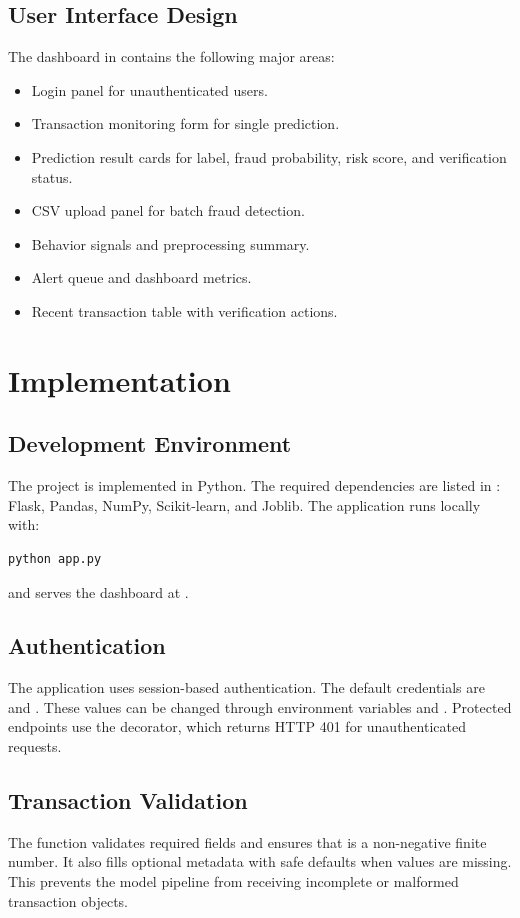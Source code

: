 \documentclass[12pt,a4paper]{report}
\begin{document}
\section{User Interface Design}
The dashboard in  contains the following major areas:
\begin{itemize}
    \item Login panel for unauthenticated users.
    \item Transaction monitoring form for single prediction.
    \item Prediction result cards for label, fraud probability, risk score, and verification status.
    \item CSV upload panel for batch fraud detection.
    \item Behavior signals and preprocessing summary.
    \item Alert queue and dashboard metrics.
    \item Recent transaction table with verification actions.
\end{itemize}

\chapter{Implementation}

\section{Development Environment}
The project is implemented in Python. The required dependencies are listed in : Flask, Pandas, NumPy, Scikit-learn, and Joblib. The application runs locally with:
\begin{verbatim}
python app.py
\end{verbatim}
and serves the dashboard at .

\section{Authentication}
The application uses session-based authentication. The default credentials are  and . These values can be changed through environment variables  and . Protected endpoints use the  decorator, which returns HTTP 401 for unauthenticated requests.

\section{Transaction Validation}
The function  validates required fields and ensures that  is a non-negative finite number. It also fills optional metadata with safe defaults when values are missing. This prevents the model pipeline from receiving incomplete or malformed transaction objects.
\end{document}
